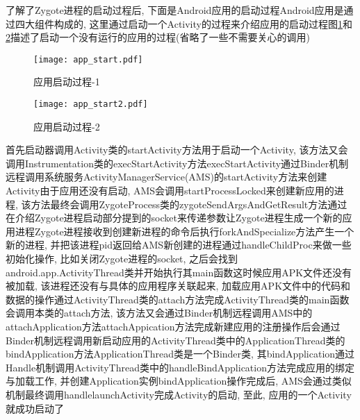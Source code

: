了解了Zygote进程的启动过程后, 下面是Android应用的启动过程\juhao Android应用是通过四大组件构成的, 这里通过启动一个Activity的过程来介绍应用的启动过程\juhao 图\ref{appStart}和\ref{appStart2}描述了启动一个没有运行的应用的过程(省略了一些不需要关心的调用)\juhao
\begin{figure}[ht]
	\centering
	\texttt{[image: app\_start.pdf]}
	\caption{应用启动过程-1}
	\label{appStart}
\end{figure}

\begin{figure}[ht]
	\centering
	\texttt{[image: app\_start2.pdf]}
	\caption{应用启动过程-2}
	\label{appStart2}
\end{figure}
首先启动器调用Activity类的startActivity方法用于启动一个Activity, 该方法又会调用Instrumentation类的execStartActivity方法\juhao  execStartActivity通过Binder机制远程调用系统服务ActivityManagerService(AMS)的startActivity方法来创建Activity\juhao 由于应用还没有启动, AMS会调用startProcessLocked来创建新应用的进程, 该方法最终会调用ZygoteProcess类的zygoteSendArgsAndGetResult方法通过在介绍Zygote进程启动部分提到的socket来传递参数让Zygote进程生成一个新的应用进程\juhao Zygote进程接收到创建新进程的命令后执行forkAndSpecialize方法产生一个新的进程, 并把该进程pid返回给AMS\juhao 新创建的进程通过handleChildProc来做一些初始化操作, 比如关闭Zygote进程的socket, 之后会找到android.app.ActivityThread类并开始执行其main函数\juhao 这时候应用APK文件还没有被加载, 该进程还没有与具体的应用程序关联起来, 加载应用APK文件中的代码和数据的操作通过ActivityThread类的attach方法完成\juhao ActivityThread类的main函数会调用本类的attach方法, 该方法又会通过Binder机制远程调用AMS中的attachApplication方法\juhao attachAppication方法完成新建应用的注册操作后会通过Binder机制远程调用新启动应用的ActivityThread类中的ApplicationThread类的bindApplication方法\juhao ApplicationThread类是一个Binder类, 其bindApplication通过Handle机制调用ActivityThread类中的handleBindApplication方法完成应用的绑定与加载工作, 并创建Application实例\juhao bindApplication操作完成后, AMS会通过类似机制最终调用handlelaunchActivity完成Activity的启动, 至此, 应用的一个Activity就成功启动了\juhao 

